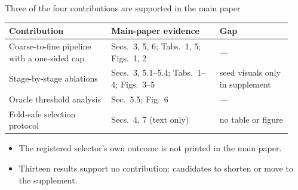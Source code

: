 
\begin{frame}{Three of the four contributions are supported in the main paper}
\begin{slidetable}
\begin{tabular}{@{}p{0.34\linewidth}p{0.36\linewidth}p{0.24\linewidth}@{}}
\toprule
Contribution & Main-paper evidence & Gap \\
\midrule
Coarse-to-fine pipeline with a one-sided cap & Secs.~3, 5, 6; Tabs.~1, 5; Figs.~1, 2 & --- \\
Stage-by-stage ablations & Secs.~3, 5.1--5.4; Tabs.~1--4; Figs.~3--5 & seed visuals only in supplement \\
Oracle threshold analysis & Sec.~5.5; Fig.~6 & --- \\
Fold-safe selection protocol & Secs.~4, 7 (text only) & no table or figure \\
\bottomrule
\end{tabular}
\end{slidetable}
\begin{itemize}
\item The registered selector's own outcome is not printed in the main paper.
\item Thirteen results support no contribution: candidates to shorten or move to the supplement.
\end{itemize}
\end{frame}
